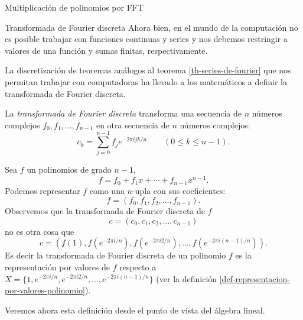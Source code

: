 \begin{chapter}{Multiplicación de polinomios por FFT}
\begin{section}{Transformada de Fourier discreta}
        Ahora bien, en  el mundo de la computación no es posible trabajar con funciones continuas y series y nos debemos restringir a valores de una función y sumas finitas, respectivamente. 
        
        La discretización de teoremas análogos al teorema \ref{th-series-de-fourier} que nos permitan trabajar con computadoras ha llevado a los matemáticos a definir la transformada de Fourier discreta.

        \begin{definicion}
            La \textit{transformada de Fourier discreta} transforma una secuencia de $n$ números complejos $f_0, f_1, \ldots, f_{n-1}$ en otra secuencia de $n$ números complejos:
            \begin{equation*}
                c_k = \sum_{j=0}^{n-1} f_j e^{-2\pi i j {k}/{n}}\qquad (0 \le k \le n-1).
            \end{equation*}
        \end{definicion}
        
        \begin{ejemplo}\label{ejem-dft-polinomios}
            Sea $f$ un polinomios de grado $n-1$, $$f = f_0+ f_1x +\cdots + f_{n-1}x^{n-1}.$$ Podemos representar $f$ como una $n$-upla con sus coeficientes:
            \begin{equation*}
                f = (f_0, f_1, f_2,\ldots, f_{n-1}).
            \end{equation*}
            Observemos que la transformada de Fourier discreta de $f$ 
            \begin{equation*}
                c = (c_0, c_1, c_2,\ldots, c_{n-1})
            \end{equation*}
            no es otra cosa que 
            \begin{equation*}
                c = (f(1), f(e^{-2\pi i/{n}}), f( e^{-2\pi i {2}/{n}}),\ldots, f( e^{-2\pi i {(n-1)}/{n}})).
            \end{equation*}
            Es decir la transformada de Fourier discreta de un polinomio $f$  es la representación por valores de $f$ respecto a $X = \{1, e^{-2\pi i /{n}},e^{-2\pi i 2/{n}}, \ldots,e^{-2\pi i {(n-1)}/{n}} \}$ (ver la definición \ref{def-representacion-por-valores-polinomio}).
        \end{ejemplo}

        Veremos ahora esta definición desde el punto de vista del álgebra lineal. 


\end{section}
\end{chapter}
